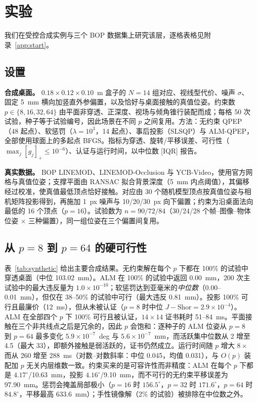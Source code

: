 \section{实验}\label{sec:experiments}
我们在受控合成实例与三个 BOP 数据集上研究该层，逐格表格见附录~\ref{app:start}。

\subsection{设置}\label{sec:setup}
\textbf{合成桌面。} $0.18\times0.12\times0.10$~m 盒子的 $N=14$ 组对应、视线型代价、噪声 $\sigma$、固定 5~mm 横向加竖直外参偏置，以及恰好与桌面接触的真值位姿。约束数 $p\in\{8,16,32,64\}$ 由平面非穿透、正深度、视场与倾角锥行装配而成；每格 50 次试验，种子等于试验编号，因此场景在不同 $p$ 之间复用。方法：无约束 QPEP（48 起点）、软惩罚（$\lambda=10^3$，14 起点）、事后投影（SLSQP）与 ALM-QPEP，全部使用球面上的多起点 BFGS。指标为穿透、旋转/平移误差、可行性（$\max_j[g_j]_+\le10^{-6}$）、认证与运行时间，以中位数 [IQR] 报告。

\textbf{真实数据。} BOP LINEMOD、LINEMOD-Occlusion 与 YCB-Video，使用官方网格与真值位姿；支撑平面由 RANSAC 拟合背景深度（5~mm 内点阈值），其偏移经过校准，使真值最低顶点恰好接触。对应由 30 个随机模型顶点按真值位姿与相机矩阵投影得到，再施加 1~px 噪声与 10/20/30~px 向下偏置；约束为沿桌面法向最低的 16 个顶点（$p=16$）。试验数为 $n=90/72/84$（30/24/28 个帧--图像--物体位姿 $\times$ 三种偏置），同一组位姿在三个偏置间复用。

\subsection{从 $p=8$ 到 $p=64$ 的硬可行性}\label{sec:synthetic}
表~\ref{tab:synthetic} 给出主要合成结果。无约束解在每个 $p$ 下都在 100\% 的试验中穿透桌面（中位 103.02~mm）。ALM 在 100\% 的试验中返回 0.00~mm，200 次主试验中的最大违反量为 $1.0\times10^{-10}$；软惩罚达到亚毫米的\emph{中位数}（0.00--0.01~mm），但仅在 38--50\% 的试验中可行（最大违反 0.81~mm）。投影 100\% 可行且最廉价（12~ms），但从未被认证（$p=8$ 时中位 $J-\mathrm{Shor}=2.9\times10^{-4}$）。ALM 在全部四个 $p$ 下 100\% 可行且被认证，$14\times14$ 证书耗时 51--84~ms。平面接触在三个非共线点之后是冗余的，因此 $p$ 会饱和：逐种子的 ALM 位姿从 $p=8$ 到 $p=64$ 最多变化 $5.9\times10^{-7}$~deg 与 $5.6\times10^{-7}$~mm，而活跃集中位数从 2 增至 4.5（最大 33），即额外接触是弱活跃的，证书仍然成立。运行时间随 $p$ 增大 $8\times$ 而从 260 增至 288~ms（对数--对数斜率：中位 0.045，均值 0.031），与 $O(p)$ 装配加 $p$ 无关内层维数一致。约束买来的是可容许性而非精度：ALM 在每个 $p$ 下都是 $4.17^\circ$/10.63~mm，投影 $4.16^\circ$/9.10~mm，而不可行的无约束平移误差为 97.90~mm。惩罚会掩盖局部极小（$p=16$ 时 $156.5^\circ$，$p=32$ 时 $171.6^\circ$，$p=64$ 时 $84.8^\circ$，平移最高 633.6~mm）；手性镜像解（2\% 的试验）被排除在中位数之外。

